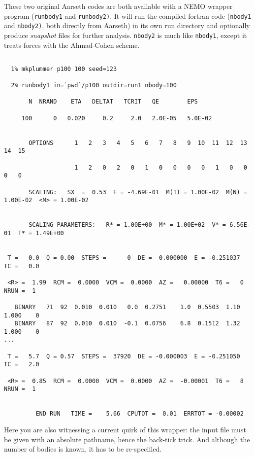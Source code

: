 These two original Aarseth codes are both available with a NEMO wrapper program
({\tt runbody1} and {\tt runbody2)}. It will run the compiled fortran 
code ({\tt nbody1} and {\tt nbody2)}, both directly from Aarseth)
in its own run directory and 
optionally produce {\it snapshot} files for further
analysis. {\tt nbody2}  is much like {\tt nbody1}, except it
treats forces with the Ahmad-Cohen scheme.

\footnotesize\begin{verbatim}

  1% mkplummer p100 100 seed=123

  2% runbody1 in=`pwd`/p100 outdir=run1 nbody=100

       N  NRAND    ETA   DELTAT   TCRIT   QE        EPS

     100      0   0.020     0.2     2.0   2.0E-05   5.0E-02
 
 
       OPTIONS      1   2   3   4   5   6   7   8   9  10  11  12  13  14  15

                    1   2   0   2   0   1   0   0   0   0   1   0   0   0   0
 
       SCALING:   SX  =  0.53  E = -4.69E-01  M(1) = 1.00E-02  M(N) = 1.00E-02  <M> = 1.00E-02
 

       SCALING PARAMETERS:   R* = 1.00E+00  M* = 1.00E+02  V* = 6.56E-01  T* = 1.49E+00
 
 
 T =   0.0  Q = 0.00  STEPS =      0  DE =  0.000000  E = -0.251037  TC =   0.0
 
 <R> =  1.99  RCM =  0.0000  VCM =  0.0000  AZ =   0.00000  T6 =   0  NRUN =  1
 
   BINARY   71  92  0.010  0.010   0.0  0.2751    1.0  0.5503  1.10  1.000    0
   BINARY   87  92  0.010  0.010  -0.1  0.0756    6.8  0.1512  1.32  1.000    0
...
 
 T =   5.7  Q = 0.57  STEPS =  37920  DE = -0.000003  E = -0.251050  TC =   2.0
 
 <R> =  0.85  RCM =  0.0000  VCM =  0.0000  AZ =  -0.00001  T6 =   8  NRUN =  1
 
 
         END RUN   TIME =    5.66  CPUTOT =  0.01  ERRTOT = -0.00002

\end{verbatim}\normalsize

Here you are also witnessing a current quirk of this wrapper: the input file
must be given with an absolute pathname, hence the back-tick trick. And 
although the number of bodies is known, it has to be re-specified.

